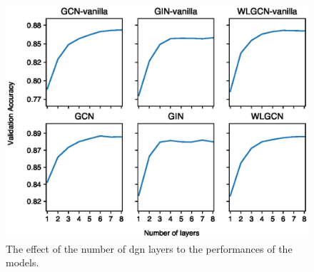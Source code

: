 \begin{figure}[h!]
    \centering
    \includegraphics[width=.8\textwidth]{Figures/Chapter5/e1-layering.eps}
    \caption{The effect of the number of \gls{dgn} layers to the performances of the models.}
    \label{fig:e1-layering}
\end{figure}


